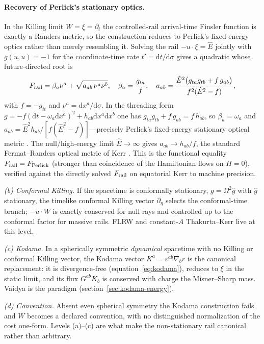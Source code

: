 \documentclass[12pt]{iopart}
\newcommand{\Ehat}{\hat E}
\newcommand{\dd}{\mathrm{d}}
\begin{document}
\paragraph{Recovery of Perlick's stationary optics.} In the Killing limit
$W=\xi=\partial_t$ the controlled-rail arrival-time Finsler function is exactly a
Randers metric, so the construction reduces to Perlick's fixed-energy optics rather
than merely resembling it. Solving the rail $-u\cdot\xi=\Ehat$ jointly with
$g(u,u)=-1$ for the coordinate-time rate $t'=\dd t/\dd\sigma$ gives a quadratic whose
future-directed root is
\begin{equation}
F_{\rm rail}=\beta_a \nu^a+\sqrt{a_{ab}\,\nu^a \nu^b},\quad
\beta_a=\frac{g_{ta}}{f},\quad
a_{ab}=\frac{\Ehat^2\bigl(g_{ta}g_{tb}+f\,g_{ab}\bigr)}{f^2(\Ehat^2-f)},
\label{eq:perlick-randers}
\end{equation}
with $f=-g_{tt}$ and $\nu^a=\dd x^a/\dd\sigma$. In the threading form
$g=-f(\dd t-\omega_a\dd x^a)^2+h_{ab}\dd x^a\dd x^b$ one has
$g_{ta}g_{tb}+f\,g_{ab}=f\,h_{ab}$, so $\beta_a=\omega_a$ and
$a_{ab}=\Ehat^2 h_{ab}/[f(\Ehat^2-f)]$---precisely Perlick's fixed-energy stationary
optical metric \cite{Perlick1991}. The null/high-energy limit $\Ehat\to\infty$ gives
$a_{ab}\to h_{ab}/f$, the standard Fermat--Randers optical metric of Kerr
\cite{GibbonsWerner2008}. This is the functional equality $F_{\rm rail}=F_{\rm Perlick}$
(stronger than coincidence of the Hamiltonian flows on $H=0$), verified against the
directly solved $F_{\rm rail}$ on equatorial Kerr to machine precision.

\emph{(b) Conformal Killing.} If the spacetime is conformally stationary,
$g=\Omega^2\hat g$ with $\hat g$ stationary, the timelike conformal Killing
vector $\partial_\eta$ selects the conformal-time branch; $-u\cdot W$ is exactly
conserved for null rays and controlled up to the conformal factor for massive
rails. FLRW and constant-$A$ Thakurta--Kerr live at this level.

\emph{(c) Kodama.} In a spherically symmetric \emph{dynamical} spacetime with no
Killing or conformal Killing vector, the Kodama vector
$K^a=\varepsilon^{ab}\nabla_b r$ \cite{Kodama1980,Hayward1996} is the canonical
replacement: it is divergence-free (equation~\eqref{eq:kodama}), reduces to $\xi$ in
the static limit, and its flux $G^{ab}K_b$ is conserved with charge the
Misner--Sharp mass. Vaidya is the paradigm (section~\ref{sec:kodama-energy}).

\emph{(d) Convention.} Absent even spherical symmetry the Kodama construction
fails and $W$ becomes a declared convention, with no distinguished normalization
of the cost one-form. Levels (a)--(c) are what make the non-stationary rail
canonical rather than arbitrary.
\end{document}
